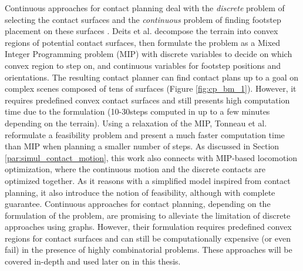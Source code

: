 Continuous approaches for contact planning deal with the \textit{discrete} problem of selecting the contact surfaces and the \textit{continuous} problem of finding footstep placement on these surfaces \cite{sl1m_v2}.
Deits et al. \cite{deits2014FootPlanMI} decompose the terrain into convex regions of potential contact surfaces, then formulate the problem as a Mixed Integer Programming problem (MIP) with discrete variables to decide on which convex region to step on, and continuous variables for footstep positions and orientations. 
The resulting contact planner can find contact plans up to a goal on complex scenes composed of tens of surfaces (Figure \ref{fig:cp_bm_1}). However, it requires predefined convex contact surfaces and still presents high computation time due to the formulation (10-30steps computed in up to a few minutes depending on the terrain).
Using a relaxation of the MIP, Tonneau et al. \cite{sl1m_v1} reformulate a feasibility problem and present a much faster computation time than MIP when planning a smaller number of steps.
As discussed in Section \ref{par:simul_contact_motion}, this work also connects with MIP-based locomotion optimization, where the continuous motion and the discrete contacts are optimized together. As it reasons with a simplified model inspired from contact planning, it also introduce the notion of feasibility, although with complete guarantee.
Continuous approaches for contact planning, depending on the formulation of the problem, are promising to alleviate the limitation of discrete approaches using graphs.
However, their formulation requires predefined convex regions for contact surfaces and can still be computationally expensive (or even fail) in the presence of highly combinatorial problems.
These approaches will be covered in-depth and used later on in this thesis.
